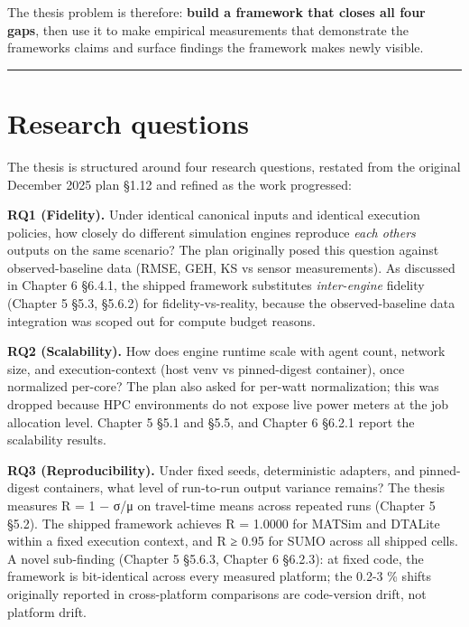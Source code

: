 The thesis problem is therefore: \textbf{build a framework that closes
all four gaps}, then use it to make empirical measurements that
demonstrate the framework\textquotesingle s claims and surface findings
the framework makes newly visible.

\begin{center}\rule{0.5\linewidth}{0.5pt}\end{center}

\section{Research questions}\label{13-research-questions}

The thesis is structured around four research questions, restated from
the original December 2025 plan §1.12 and refined as the work
progressed:

\textbf{RQ1 (Fidelity).} Under identical canonical inputs and identical
execution policies, how closely do different simulation engines
reproduce \emph{each other\textquotesingle s} outputs on the same
scenario? The plan originally posed this question against
observed-baseline data (RMSE, GEH, KS vs sensor measurements). As
discussed in Chapter 6 §6.4.1, the shipped framework substitutes
\emph{inter-engine} fidelity (Chapter 5 §5.3, §5.6.2) for
fidelity-vs-reality, because the observed-baseline data integration was
scoped out for compute budget reasons.

\textbf{RQ2 (Scalability).} How does engine runtime scale with agent
count, network size, and execution-context (host venv vs pinned-digest
container), once normalized per-core? The plan also asked for
per-watt normalization; this was dropped because HPC environments do not
expose live power meters at the job allocation level. Chapter 5 §5.1 and
§5.5, and Chapter 6 §6.2.1 report the scalability results.

\textbf{RQ3 (Reproducibility).} Under fixed seeds, deterministic
adapters, and pinned-digest containers, what level of run-to-run output
variance remains? The thesis measures R = 1 − σ/μ on travel-time means
across repeated runs (Chapter 5 §5.2). The shipped framework achieves R
= 1.0000 for MATSim and DTALite within a fixed execution context, and R
≥ 0.95 for SUMO across all shipped cells. A novel sub-finding (Chapter 5
§5.6.3, Chapter 6 §6.2.3): at fixed code, the framework is bit-identical
across every measured platform; the 0.2-3 \% shifts originally reported
in cross-platform comparisons are code-version drift, not platform
drift.

